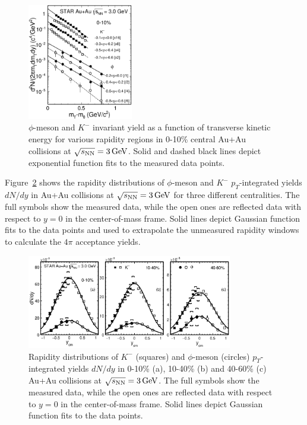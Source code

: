\documentclass[%
 reprint,	
showpacs,
 amsmath,amssymb,
 aps,
 prc,
]{revtex4-1}
\begin{document}
\begin{figure}
\centering
\includegraphics[width=0.41\textwidth]{fig/fig2_h_mT_spectra_phiMeson.eps}
  \caption{ $\phi$-meson and $K^-$ invariant yield as a function of transverse kinetic energy for various rapidity regions in 0-10\% central Au+Au collisions at ${\sqrt{s_{\rm NN}} = \rm{3\,GeV}}$. Solid and dashed black lines depict exponential function fits to the measured data points.}
\label{fig:phimTSpectra} 
\end{figure}


Figure~\ref{fig:phiYSpectra} shows the rapidity distributions of $\phi$-meson and $K^-$ $p_T$-integrated yields $dN/dy$ in Au+Au collisions at ${\sqrt{s_{\rm NN}} = \rm{3\,GeV}}$ for three different centralities. The full symbols show the measured data, while the open ones are reflected data with respect to $y=0$ in the center-of-mass frame. Solid lines depict Gaussian function fits to the data points and used to extrapolate the unmeasured rapidity windows to calculate the $4\pi$ acceptance yields.


\begin{figure}
\centering
\includegraphics[width=0.8\textwidth]{fig/fig3_dndy.eps}
  \caption{ Rapidity distributions of $K^-$ (squares) and $\phi$-meson (circles) $p_T$-integrated yields $dN/dy$ in 0-10\% (a), 10-40\% (b) and 40-60\% (c) Au+Au collisions at ${\sqrt{s_{\rm NN}} = \rm{3\,GeV}}$. The full symbols show the measured data, while the open ones are reflected data with respect to $y=0$ in the center-of-mass frame. Solid lines depict Gaussian function fits to the data points.}
\label{fig:phiYSpectra} 
\end{figure}
\end{document}
